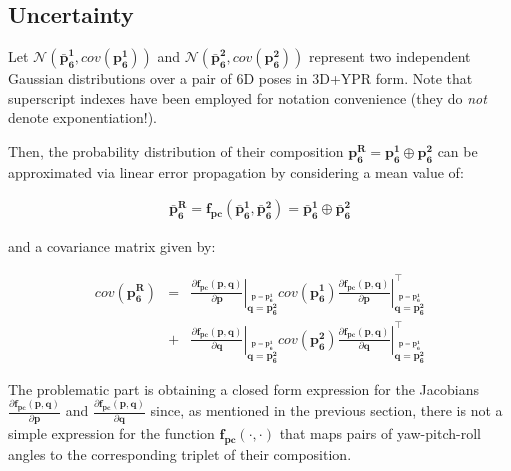 \documentclass[a4paper,11pt]{report}
\begin{document}
\subsection{Uncertainty}

Let $\mathcal{N}(\mathbf{\bar{p}_6^1}, cov(\mathbf{p_6^1}))$ and 
$\mathcal{N}(\mathbf{\bar{p}_6^2}, cov(\mathbf{p_6^2}))$ represent
two independent Gaussian distributions over a pair of 6D 
poses in 3D+YPR form. 
Note that superscript indexes have been employed 
for notation convenience (they do \emph{not} denote exponentiation!).

Then, the probability distribution of their composition 
$\mathbf{p_6^R} = \mathbf{p_6^1} \oplus \mathbf{p_6^2}$
can be approximated via linear error propagation by considering 
a mean value of:

\begin{eqnarray}
\mathbf{\bar{p}_6^R} 
= \mathbf{f_{pc}}(\mathbf{\bar{p}_6^1}, \mathbf{\bar{p}_6^2}) 
= \mathbf{\bar{p}_6^1} \oplus \mathbf{\bar{p}_6^2}
\end{eqnarray}

\noindent and a covariance matrix given by:

\begin{eqnarray}
cov(\mathbf{p_6^R}) &=& 
\left. \frac{\partial \mathbf{f_{pc}}(\mathbf{p},\mathbf{q}) }{\partial \mathbf{p}} \right|_{\overset{ \mathbf{p}=\mathbf{p_6^1} }{ \mathbf{q}=\mathbf{p_6^2} }}
cov(\mathbf{p_6^1})
\left. \frac{\partial \mathbf{f_{pc}}(\mathbf{p},\mathbf{q}) }{\partial \mathbf{p}} \right|_{\overset{ \mathbf{p}=\mathbf{p_6^1} }{ \mathbf{q}=\mathbf{p_6^2} }}^\top
\nonumber \\ &+&
\left. \frac{\partial \mathbf{f_{pc}}(\mathbf{p},\mathbf{q}) }{\partial \mathbf{q}} \right|_{\overset{ \mathbf{p}=\mathbf{p_6^1} }{ \mathbf{q}=\mathbf{p_6^2} }}
cov(\mathbf{p_6^2})
\left. \frac{\partial \mathbf{f_{pc}}(\mathbf{p},\mathbf{q}) }{\partial \mathbf{q}} \right|_{\overset{ \mathbf{p}=\mathbf{p_6^1} }{ \mathbf{q}=\mathbf{p_6^2} }}^\top
\end{eqnarray}

The problematic part is obtaining a closed form expression for the 
Jacobians 
$\frac{\partial \mathbf{f_{pc}}(\mathbf{p},\mathbf{q}) }{\partial \mathbf{p}}$
and 
$\frac{\partial \mathbf{f_{pc}}(\mathbf{p},\mathbf{q}) }{\partial \mathbf{q}}$ 
since, as mentioned in the previous section, there is not a simple expression 
for the function $\mathbf{f_{pc}}(\cdot,\cdot)$ that maps pairs of yaw-pitch-roll angles
to the corresponding triplet of their composition.
\end{document}
